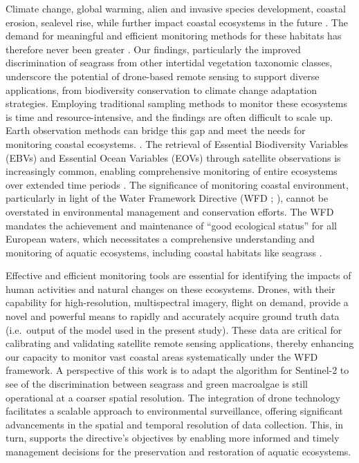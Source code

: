 \documentclass[
  number]{elsarticle}
\begin{document}
Climate change, global warming, alien and invasive species development,
coastal erosion, sealevel rise, while further impact coastal ecosystems
in the future \citetext{\citealp{SCHIBALSKI2022101414}; \citealp[
]{holon2018predictive}; \citealp{marquet2024global}}. The demand for
meaningful and efficient monitoring methods for these habitats has
therefore never been greater \citetext{\citealp[
]{muller2018satellite}; \citealp[
]{villalobos2023remote}; \citealp{oiry2021using}}. Our findings,
particularly the improved discrimination of seagrass from other
intertidal vegetation taxonomic classes, underscore the potential of
drone-based remote sensing to support diverse applications, from
biodiversity conservation to climate change adaptation strategies.
Employing traditional sampling methods to monitor these ecosystems is
time and resource-intensive, and the findings are often difficult to
scale up. Earth observation methods can bridge this gap and meet the
needs for monitoring coastal ecosystems.
\citep{papathanasopoulou2019satellite}. The retrieval of Essential
Biodiversity Variables (EBVs) and Essential Ocean Variables (EOVs)
through satellite observations is increasingly common, enabling
comprehensive monitoring of entire ecosystems over extended time periods
\citetext{\citealp[
]{ratnarajah2023monitoring}; \citealp{ZOFFOLI2020112020}}. The
significance of monitoring coastal environment, particularly in light of
the Water Framework Directive (WFD ; \citep{WFD2000}), cannot be
overstated in environmental management and conservation efforts. The WFD
mandates the achievement and maintenance of ``good ecological status''
for all European waters, which necessitates a comprehensive
understanding and monitoring of aquatic ecosystems, including coastal
habitats like seagrass \citetext{\citealp[
]{foden2007angiosperms}; \citealp[
]{nordlund2024one}; \citealp{Zoffoli2021}}.

Effective and efficient monitoring tools are essential for identifying
the impacts of human activities and natural changes on these ecosystems.
Drones, with their capability for high-resolution, multispectral
imagery, flight on demand, provide a novel and powerful means to rapidly
and accurately acquire ground truth data (i.e.~output of the model used
in the present study). These data are critical for calibrating and
validating satellite remote sensing applications, thereby enhancing our
capacity to monitor vast coastal areas systematically under the WFD
framework. A perspective of this work is to adapt the algorithm for
Sentinel-2 to see of the discrimination between seagrass and green
macroalgae is still operational at a coarser spatial resolution. The
integration of drone technology facilitates a scalable approach to
environmental surveillance, offering significant advancements in the
spatial and temporal resolution of data collection. This, in turn,
supports the directive's objectives by enabling more informed and timely
management decisions for the preservation and restoration of aquatic
ecosystems.
\end{document}
